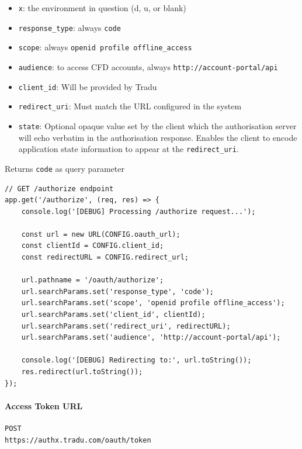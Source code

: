 \documentclass[11pt]{article}
\begin{document}
\begin{itemize}
    \item \verb|x|: the environment in question (d, u, or blank) 
    \item \verb|response_type|: always \verb|code|
    \item \verb|scope|: always \verb|openid profile offline_access|
    \item \verb|audience|: to access CFD accounts, always \verb|http://account-portal/api|
    \item \verb|client_id|: Will be provided by Tradu
    \item \verb|redirect_uri|: Must match the URL configured in the system
     \item \verb|state|: Optional opaque value set by the client which the authorisation server will echo verbatim in the authorisation response. Enables the client to encode application state information to appear at the \verb|redirect_uri|.
\end{itemize}

Returns \verb|code| as query parameter

\begin{codebox}
\begin{verbatim}
// GET /authorize endpoint
app.get('/authorize', (req, res) => {
    console.log('[DEBUG] Processing /authorize request...');

    const url = new URL(CONFIG.oauth_url);
    const clientId = CONFIG.client_id;
    const redirectURL = CONFIG.redirect_url;

    url.pathname = '/oauth/authorize';
    url.searchParams.set('response_type', 'code');
    url.searchParams.set('scope', 'openid profile offline_access');
    url.searchParams.set('client_id', clientId);
    url.searchParams.set('redirect_uri', redirectURL);
    url.searchParams.set('audience', 'http://account-portal/api');

    console.log('[DEBUG] Redirecting to:', url.toString());
    res.redirect(url.toString());
});
\end{verbatim}
\end{codebox}


\paragraph{Access Token URL}

\begin{verbatim}
POST
https://authx.tradu.com/oauth/token
\end{verbatim} 
\end{document}
